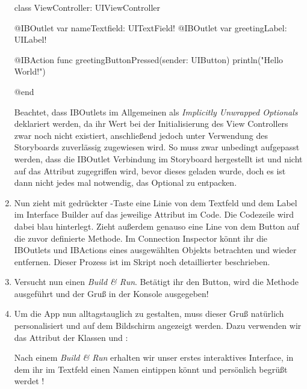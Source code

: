 \documentclass[parskip=half, final]{scrreprt}
\begin{document}
\begin{lecture}
\begin{enumerate}
\begin{swiftcode}
class ViewController: UIViewController {

    @IBOutlet var nameTextfield: UITextField!
    @IBOutlet var greetingLabel: UILabel!

    @IBAction func greetingButtonPressed(sender: UIButton) {
        println("Hello World!")
    }
    
}
@end
\end{swiftcode}

	Beachtet, dass IBOutlets im Allgemeinen als \emph{Implicitly Unwrapped Optionals} deklariert werden, da ihr Wert bei der Initialisierung des View Controllers zwar noch nicht existiert, anschließend jedoch unter Verwendung des Storyboards zuverlässig zugewiesen wird. So muss zwar unbedingt aufgepasst werden, dass die IBOutlet Verbindung im Storyboard hergestellt ist und nicht auf das Attribut zugegriffen wird, bevor dieses geladen wurde, doch es ist dann nicht jedes mal notwendig, das Optional zu entpacken.

\item Nun zieht mit gedrückter \keys{\ctrl}-Taste eine Linie von dem Textfeld und dem Label im Interface Builder auf das jeweilige Attribut im Code. Die Codezeile wird dabei blau hinterlegt. Zieht außerdem genauso eine Line von dem Button auf die zuvor definierte Methode. Im Connection Inspector könnt ihr die IBOutlets und IBActions eines ausgewählten Objekts betrachten und wieder entfernen. Dieser Prozess ist im Skript noch detaillierter beschrieben.

\item Versucht nun einen \emph{Build \& Run}. Betätigt ihr den Button, wird die Methode ausgeführt und der Gruß  in der Konsole ausgegeben!

\item Um die App nun alltagstauglich zu gestalten, muss dieser Gruß natürlich personalisiert und auf dem Bildschirm angezeigt werden. Dazu verwenden wir das Attribut  der Klassen  und :


	Nach einem \emph{Build \& Run} erhalten wir unser erstes interaktives Interface, in dem ihr im Textfeld einen Namen eintippen könnt und persönlich begrüßt werdet !


\end{enumerate}
\end{lecture}
\end{document}
